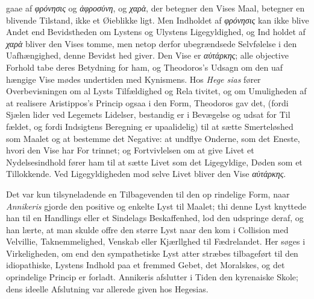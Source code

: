 \documentclass[12pt,a4paper]{book}
\newcommand{\gk}[1]{\textit{#1}}
\begin{document}
gaae af \gk{φρόνησις} og \gk{ἀφροσύνη}, og \gk{χαρὰ}, der betegner den
Vises Maal, betegner en blivende Tilstand, ikke et Øieblikke\-%
ligt. Men Indholdet af \gk{φρόνησις} kan ikke blive Andet end
Bevidstheden om Lystens og Ulystens Ligegyldighed, og Ind\-%
holdet af \gk{χαρὰ} bliver den Vises tomme, men netop derfor
ubegrændsede Selvfølelse i den Uafhængighed, denne Bevidst\-%
hed giver. Den Vise er \gk{αὐτάρκης}; alle objective Forhold tabe
deres Betydning for ham, og Theodoros's Udsagn om den uaf\-%
hængige Vise mødes undertiden med Kynismens. Hos \emph{Hege\-%
sias} fører Overbevisningen om al Lysts Tilfældighed og Rela\-%
tivitet, og om Umuligheden af at realisere Aristippos's Princip
ogsaa i den Form, Theodoros gav det, (fordi Sjælen lider ved
Legemets Lidelser, bestandig er i Bevægelse og udsat for Til\-%
fældet, og fordi Indsigtens Beregning er upaalidelig) til at
sætte Smerteløshed som Maalet og at bestemme det Negative:
at undflye Onderne, som det Eneste, hvori den Vise har For\-%
trinnet; og Fortvivlelsen om at give Livet et Nydelsesindhold
fører ham til at sætte Livet som det Ligegyldige, Døden som
et Tillokkende. Ved Ligegyldigheden mod selve Livet bliver
den Vise \gk{αὐτάρκης}.

Det var kun tilsyneladende en Tilbagevenden til den op\-%
rindelige Form, naar \emph{Annikeris} gjorde den positive og
enkelte Lyst til Maalet; thi denne Lyst knyttede han til en
Handlings eller et Sindelags Beskaffenhed, lod den udspringe
deraf, og han lærte, at man skulde offre den større Lyst naar
den kom i Collision med Velvillie, Taknemmelighed, Venskab
eller Kjærllghed til Fædrelandet. Her søges i Virkeligheden,
om end den sympathetiske Lyst atter stræbes tilbageført til
den idiopathiske, Lystens Indhold paa et fremmed Gebet, det
Moralskes, og det oprindelige Princip er forladt. Annikeris
afslutter i Tiden den kyrenaiske Skole; dens ideelle Afslutning
var allerede given hos Hegesias.
\end{document}

